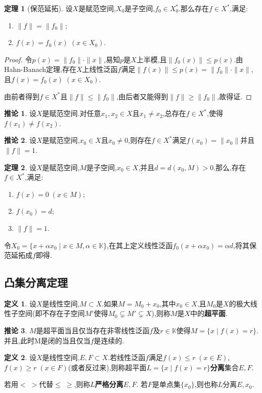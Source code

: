 \documentclass{ctexart}
\theoremstyle{definition}
\newtheorem{definition}{定义}
\newtheorem{theorem}{定理}
\newtheorem{corollary}{推论}
\theoremstyle{remark}
\newenvironment{proofsketch}{
  \renewcommand{\proofname}{证明概要}\proof}{\endproof}
\begin{document}
	\begin{theorem}[保范延拓]
		设$X$是赋范空间,$X_0$是子空间,$f_0\in X_0^*$.那么存在$f\in X^*$,满足:
		\begin{enumerate}
			\item $\|f\|=\|f_0\|$;
			\item $f(x)=f_0(x)\;(x\in X_0)$.
		\end{enumerate}
	\end{theorem}
	\begin{proof}
		令$p(x)=\|f_0\|\cdot\|x\|$,易知$p$是$X$上半模,且$\|f_0(x)\|\le p(x)$.由Hahn-Banach定理,存在$X$上线性泛函$f$满足$\|f(x)\|\le p(x)=\|f_0\|\cdot\|x\|$,且$f(x)=f_0(x)\;(x\in X_0)$.
		
		由前者得到$f\in X^*$且$\|f\|\le\|f_0\|$,由后者又能得到$\|f\|\ge\|f_0\|$,故得证.
	\end{proof}
	\begin{corollary}
		设$X$是赋范空间.对任意$x_1,x_2\in X$且$x_1\ne x_2$,总存在$f\in X^*$,使得$f(x_1)\ne f(x_2)$.
	\end{corollary}
	\begin{corollary}\label{corollary-hahn-banach}
		设$X$是赋范空间,$x_0\in X$且$x_0\ne 0$,则存在$f\in X^*$满足$f(x_0)=\|x_0\|$并且$\|f\|=1$.
	\end{corollary}
	
	\begin{theorem}
		设$X$是赋范空间,$M$是子空间,$x_0\in X$,并且$d=d(x_0,M)>0$.那么,存在$f\in X^*$,满足:
		\begin{enumerate}
			\item $f(x)=0\;(x\in M)$;
			\item $f(x_0)=d$;
			\item $\|f\|=1$.
		\end{enumerate}
	\end{theorem}
	\begin{proofsketch}
		令$X_0=\{x+\alpha x_0\mid x\in M,\alpha\in\mathbb{K}\}$,在其上定义线性泛函$f_0(x+\alpha x_0)=\alpha d$,将其保范延拓成$f$即得.
	\end{proofsketch}
	
	\subsection{凸集分离定理}
	
	\begin{definition}
		设$X$是线性空间,$M\subset X$.如果$M=M_0+x_0$,其中$x_0\in X$,且$M_0$是$X$的极大线性子空间(即不存在子空间$M'$使得$M_0\subsetneq M'\subsetneq X$),则称$M$是$X$中的\textbf{超平面}.
	\end{definition}
	\begin{corollary}
		$M$是超平面当且仅当存在非零线性泛函$f$及$r\in\mathbb{K}$使得$M=\{x\mid f(x)=r\}$.并且,此时M是闭的当且仅当$f$是连续的.
	\end{corollary}
	\begin{definition}
		设$X$是线性空间,$E,F\subset X$.若线性泛函$f$满足$f(x)\le r\;(x\in E)$,$f(x)\ge r\;(x\in F)$(或者反过来),则称超平面$L=\{x\mid f(x)=r\}$\textbf{分离}集合$E,F$.
		
		若用$<\;>$代替$\le\;\ge$,则称$L$\textbf{严格分离}$E,F$.
		若$F$是单点集$\{x_0\}$,则也称$L$分离$E,x_0$.
	\end{definition}
	
\end{document}

